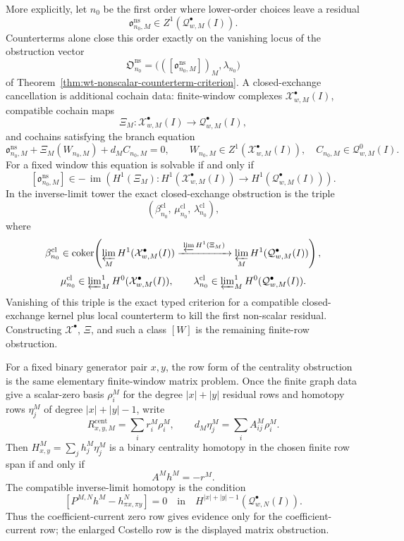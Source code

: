 \documentclass[11pt]{memoir}
\begin{document}
\begin{prob}
  More explicitly, let \(n_0\) be the first order where lower-order
  choices leave a residual
  \[
    \mathfrak o^{\mathrm{ns}}_{n_0,M}
      \in Z^1(\mathcal Q^\bullet_{w,M}(I)).
  \]
  Counterterms alone close this order exactly on the vanishing locus of
  the obstruction vector
  \[
    \mathfrak O^{\mathrm{ns}}_{n_0}
      =
      \bigl(([\mathfrak o^{\mathrm{ns}}_{n_0,M}])_M,\lambda_{n_0}\bigr)
  \]
  of Theorem~\ref{thm:wt-nonscalar-counterterm-criterion}.  A
  closed-exchange cancellation is additional cochain data: finite-window
  complexes \(\mathcal X^\bullet_{w,M}(I)\), compatible cochain maps
  \[
    \Xi_M\colon
    \mathcal X^\bullet_{w,M}(I)\longrightarrow
    \mathcal Q^\bullet_{w,M}(I),
  \]
  and cochains satisfying the branch equation
  \[
    \mathfrak o^{\mathrm{ns}}_{n_0,M}
      +\Xi_M(W_{n_0,M})
      +d_M C_{n_0,M}=0,
    \qquad
    W_{n_0,M}\in Z^1(\mathcal X^\bullet_{w,M}(I)),\quad
    C_{n_0,M}\in\mathcal Q^0_{w,M}(I).
  \]
  For a fixed window this equation is solvable if and only if
  \[
    [\mathfrak o^{\mathrm{ns}}_{n_0,M}]
      \in
    -\,\operatorname{im}\!\left(
      H^1(\Xi_M)\colon
      H^1(\mathcal X^\bullet_{w,M}(I))
      \to H^1(\mathcal Q^\bullet_{w,M}(I))
    \right).
  \]
  In the inverse-limit tower the exact closed-exchange obstruction is the
  triple
  \[
    \left(
      \beta^{\mathrm{cl}}_{n_0},\,
      \mu^{\mathrm{cl}}_{n_0},\,
      \lambda^{\mathrm{cl}}_{n_0}
    \right),
  \]
  where
  \[
    \beta^{\mathrm{cl}}_{n_0}\in
      \operatorname{coker}\!\left(
        \varprojlim_M H^1(\mathcal X^\bullet_{w,M}(I))
        \xrightarrow{\ \varprojlim H^1(\Xi_M)\ }
        \varprojlim_M H^1(\mathcal Q^\bullet_{w,M}(I))
      \right),
  \]
  \[
    \mu^{\mathrm{cl}}_{n_0}\in
      \varprojlim\nolimits^1_M H^0(\mathcal X^\bullet_{w,M}(I)),
    \qquad
    \lambda^{\mathrm{cl}}_{n_0}\in
      \varprojlim\nolimits^1_M H^0(\mathcal Q^\bullet_{w,M}(I)).
  \]
	  Vanishing of this triple is the exact typed criterion for a compatible
	  closed-exchange kernel plus local counterterm to kill the first
	  non-scalar residual.  Constructing
	  \(\mathcal X^\bullet\), \(\Xi\), and such a class \([W]\) is the
	  remaining finite-row obstruction.

  For a fixed binary generator pair \(x,y\), the row form of the
  centrality obstruction is the same elementary finite-window matrix
  problem.  Once the finite graph data give a scalar-zero basis
  \(\rho^M_i\) for the degree \(|x|+|y|\) residual rows and
  homotopy rows \(\eta^M_j\) of degree \(|x|+|y|-1\), write
  \[
    R^{\mathrm{cent}}_{x,y,M}=\sum_i r^M_i\rho^M_i,\qquad
    d_M\eta^M_j=\sum_i A^M_{ij}\rho^M_i .
  \]
  Then \(H^M_{x,y}=\sum_jh^M_j\eta^M_j\) is a binary centrality homotopy
	  in the chosen finite row span if and only if
  \[
    A^Mh^M=-r^M .
  \]
  The compatible inverse-limit homotopy is the condition
  \[
    [P^{M,N}h^M-h^N_{\pi x,\pi y}]
    =
    0
    \quad\text{in}\quad
    H^{|x|+|y|-1}(\mathcal Q^\bullet_{w,N}(I)).
  \]
  Thus the coefficient-current zero row gives evidence only for the
  coefficient-current row; the enlarged Costello row is the displayed
  matrix obstruction.


\end{prob}
\end{document}
